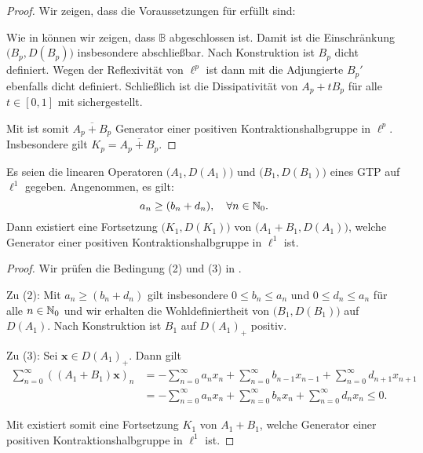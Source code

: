 \begin{proof}
Wir zeigen, dass die Voraussetzungen für  erfüllt sind: 
\par
Wie in  können wir zeigen, dass $\mathbb B$ abgeschlossen ist. Damit ist die Einschränkung $\big(B_p, D(B_p)\big)$ insbesondere abschließbar. Nach Konstruktion ist $B_p$ dicht definiert. Wegen der Reflexivität von $\ell^p$ ist dann mit  die Adjungierte $B_p'$ ebenfalls dicht definiert. Schließlich ist die Dissipativität von $A_p+tB_p$ für alle $t\in[0,1]$ mit  sichergestellt. 
\par
Mit  ist somit $\overline{A_p+B_p}$ Generator einer positiven Kontraktionshalbgruppe in $\ell^p$. Insbesondere gilt $K_p=\overline{A_p+B_p}$.
\end{proof}

\newpage




\begin{folg}\label{Störungstheorem für GTP 2}
Es seien die linearen Operatoren  $\big(A_1, D(A_1)\big)$ und  $\big(B_1, D(B_1)\big)$ eines GTP auf $\ell^1$ gegeben. Angenommen, es gilt:%
\begin{equation*}
a_n\geq (b_n + d_n),\quad \forall n\in\mathbb{N}_0.
\end{equation*}
Dann existiert eine Fortsetzung $\big(K_1, D(K_1)\big)$ von $\big(A_1+B_1, D(A_1)\big)$, welche Generator einer positiven Kontraktionshalbgruppe in $\ell^1$ ist.
\end{folg}

\begin{proof}
Wir prüfen die Bedingung (2) und (3) in .
\par
Zu (2): Mit $a_n\geq (b_n+d_n)$  gilt insbesondere $0\leq b_n\leq a_n$ und $0\leq d_n\leq a_n$ für alle $n\in\mathbb{N}_0$ und wir erhalten die Wohldefiniertheit von $\big(B_1, D(B_1)\big)$ auf $D(A_1)$. Nach Konstruktion ist $B_1$ auf $D(A_1)_+$ positiv.
\par
Zu (3): Sei  $\textbf{x}\in D(A_1)_+$. Dann gilt 
\begin{align*}
\sum_{n=0}^\infty ((A_1+B_1)\textbf{x})_n
&= -\sum_{n=0}^\infty a_n x_n +\sum_{n=0}^\infty b_{n-1}x_{n-1}+\sum_{n=0}^\infty d_{n+1}x_{n+1}\\
&=-\sum_{n=0}^\infty a_n x_n + \sum_{n=0}^\infty b_n x_n+\sum_{n=0}^\infty d_n x_n\leq 0.
\end{align*}
\par
Mit  existiert somit eine Fortsetzung $K_1$ von $A_1+B_1$, welche Generator einer positiven Kontraktionshalbgruppe in $\ell^1$ ist.
\end{proof}

